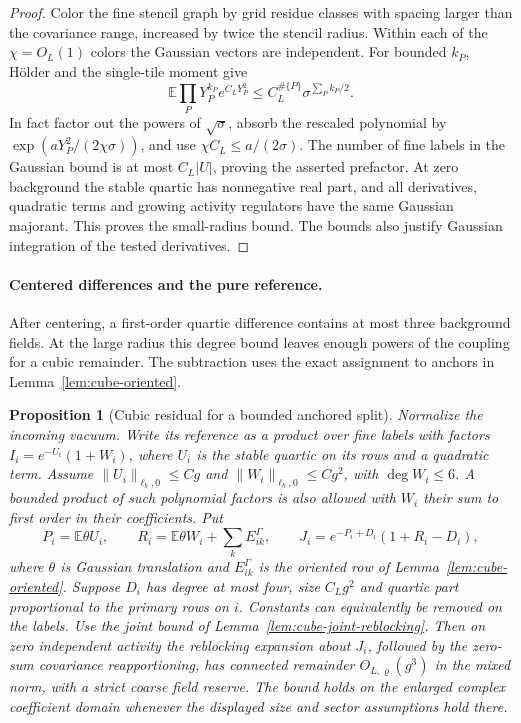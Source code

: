 \documentclass[11pt]{article}
\newtheorem{proposition}[theorem]{Proposition}
\theoremstyle{definition}
\newcommand{\E}{\mathbb E}
\begin{document}
\begin{proof}
Color the fine stencil graph by grid residue classes with spacing
larger than the covariance range, increased by twice the stencil
radius. Within each of the \(\chi=O_L(1)\) colors the Gaussian
vectors are independent. For bounded \(k_P\), Hölder and the
single-tile moment give
\begin{equation}
 \E\prod_P Y_P^{k_P}e^{C_LY_P^2}
 \le C_L^{\#\{P\}}\sigma^{\sum_P k_P/2}.
\end{equation}
In fact factor out the powers of \(\sqrt\sigma\), absorb the
rescaled polynomial by \(\exp(aY_P^2/(2\chi\sigma))\), and
use \(\chi C_L\le a/(2\sigma)\). The number of fine labels in
the Gaussian bound is at most \(C_L|U|\), proving the asserted
prefactor. At zero background the stable quartic has nonnegative
real part, and all derivatives, quadratic terms and growing
activity regulators have the same Gaussian majorant. This proves
the small-radius bound. The bounds also justify Gaussian
integration of the tested derivatives.
\end{proof}

\paragraph{Centered differences and the pure reference.}
After centering, a first-order quartic difference contains at most
three background fields. At the large radius this degree bound
leaves enough powers of the coupling for a cubic remainder.
The subtraction uses the exact assignment to anchors in
Lemma~\ref{lem:cube-oriented}.

\begin{proposition}[Cubic residual for a bounded anchored split]
\label{prop:cube-pure-cubic}
Normalize the incoming vacuum. Write its reference as a product
over fine labels with factors \(I_i=e^{-U_i}(1+W_i)\), where
\(U_i\) is the stable quartic on its rows and a quadratic term.
Assume \(\|U_i\|_{\ell_b,0}\le C g\) and
\(\|W_i\|_{\ell_b,0}\le C g^2\), with \(\deg W_i\le6\).
A bounded product of such polynomial factors is also allowed
with \(W_i\) their sum to first order in their coefficients.
Put
\begin{equation}
 P_i=\E\theta U_i,\qquad
 R_i=\E\theta W_i+\sum_k E^\Gamma_{ik},\qquad
 J_i=e^{-P_i+D_i}(1+R_i-D_i),
\end{equation}
where \(\theta\) is Gaussian translation and \(E^\Gamma_{ik}\)
is the oriented row of Lemma~\ref{lem:cube-oriented}.
Suppose \(D_i\) has degree at most four, size \(C_Lg^2\) and
quartic part proportional to the primary rows on \(i\).
Constants can equivalently be removed on the labels.
Use the joint bound of Lemma~\ref{lem:cube-joint-reblocking}.
Then on zero independent activity the reblocking expansion about
\(J_i\), followed by the zero-sum covariance reapportioning, has
connected remainder \(O_{L,\varrho}(g^3)\) in the mixed norm,
with a strict coarse field reserve. The bound holds on the
enlarged complex coefficient domain whenever the displayed
size and sector assumptions hold there.
\end{proposition}
\end{document}
